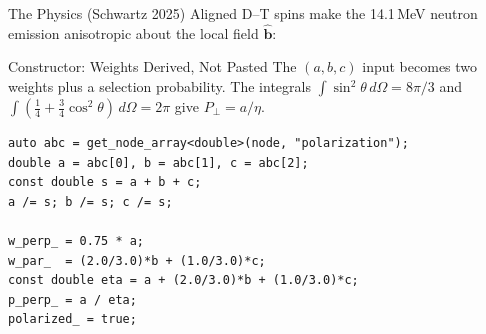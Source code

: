 \documentclass[11pt,aspectratio=169]{beamer}
\newcommand{\bhat}{\hat{\mathbf{b}}}
\begin{document}
\begin{frame}{The Physics (Schwartz 2025)}
Aligned D--T spins make the 14.1\,MeV neutron emission anisotropic about the local field
$\bhat$:
\only<1>{\[
\frac{d\sigma}{d\Omega} = \frac{\sigma_0}{2\pi}\Big[\tfrac34\,a\,\sin^2\theta
 + \big(\tfrac23 b + \tfrac13 c\big)\big(\tfrac14 + \tfrac34\cos^2\theta\big)\Big],
\qquad \theta = \angle(\mathbf{u},\bhat).
\]}
\only<2->{\[
\frac{d\sigma}{d\Omega} = \frac{\sigma_0}{2\pi}\Big[
 \underbrace{\tfrac34\,a\,\sin^2\theta}_{\text{perp shape}}
 + \underbrace{\big(\tfrac23 b + \tfrac13 c\big)\big(\tfrac14 + \tfrac34\cos^2\theta\big)}_{\text{parallel shape}}\Big],
\qquad \theta = \angle(\mathbf{u},\bhat).
\]}
\end{frame}

\begin{frame}[fragile]{Constructor: Weights Derived, Not Pasted}
The $(a,b,c)$ input becomes two weights plus a selection probability. The integrals
$\int\sin^2\theta\,d\Omega = 8\pi/3$ and $\int(\tfrac14+\tfrac34\cos^2\theta)\,d\Omega = 2\pi$
give $P_\perp = a/\eta$.
\begin{verbatim}
auto abc = get_node_array<double>(node, "polarization");
double a = abc[0], b = abc[1], c = abc[2];
const double s = a + b + c;
a /= s; b /= s; c /= s;

w_perp_ = 0.75 * a;
w_par_  = (2.0/3.0)*b + (1.0/3.0)*c;
const double eta = a + (2.0/3.0)*b + (1.0/3.0)*c;
p_perp_ = a / eta;
polarized_ = true;
\end{verbatim}
\end{frame}
\end{document}

